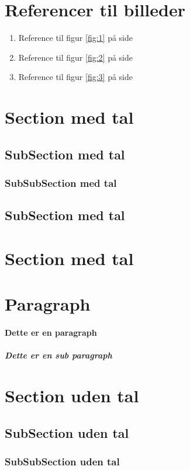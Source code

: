 \documentclass{article}
\begin{document}
    \section{Referencer til billeder}
    \begin{enumerate}[label=(\alph*)]
        \item Reference til figur \ref{fig:1} på side \pageref{fig:1}
        \item Reference til figur \ref{fig:2} på side \pageref{fig:2}
        \item Reference til figur \ref{fig:3} på side \pageref{fig:3}
    \end{enumerate}
    \section{Section med tal}
    \subsection{SubSection med tal}
    \subsubsection{SubSubSection med tal}
    \subsection{SubSection med tal}
    \section{Section med tal}
    \section{Paragraph}
    \paragraph{Dette er en paragraph}
    \subparagraph{Dette er en sub paragraph}
    \section*{Section uden tal}
    \subsection*{SubSection uden tal}
    \subsubsection*{SubSubSection uden tal}
\end{document}
